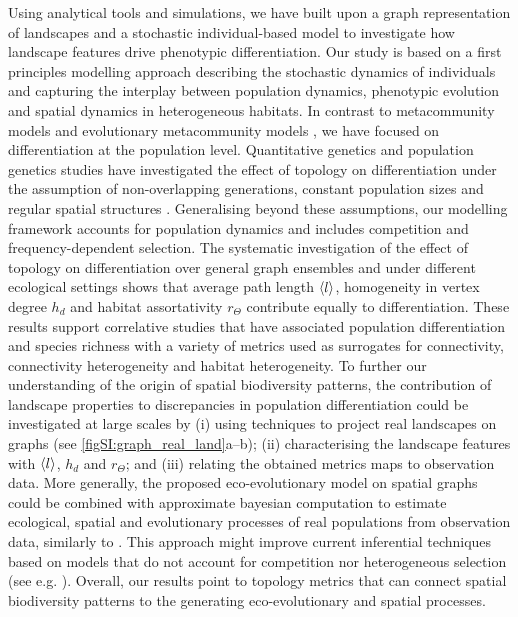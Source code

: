 Using analytical tools and simulations, we have built upon a graph representation of landscapes and a stochastic individual-based model to investigate how landscape features drive phenotypic differentiation.
%
Our study is based on a first principles modelling approach \citep{Champagnat2006} describing the stochastic dynamics of individuals and capturing the interplay between population dynamics, phenotypic evolution and spatial dynamics in heterogeneous habitats. In contrast to metacommunity models \citep{Holland2008,Gilarranz2012,Mari2014,Gravel2016,Carrara2012,Thompson2017,Suzuki2021} and evolutionary metacommunity models \citep{Economo2007,Economo2010}, we have focused on differentiation at the population level. Quantitative genetics and population genetics studies have investigated the effect of topology on differentiation under the assumption of non-overlapping generations, constant population sizes and regular spatial structures \citep{Burger2000,Kimura1964,Lande1991,Nagylaki1994,Yeaman2011}. Generalising beyond these assumptions, our modelling framework accounts for population dynamics and includes competition and frequency-dependent selection. The systematic investigation of the effect of topology on differentiation over general graph ensembles and under different ecological settings shows that average path length $\langle l \rangle$, homogeneity in vertex degree $h_d$ and habitat assortativity $r_\Theta$ contribute equally to differentiation.
%
These results support correlative studies that have associated population differentiation \citep{Manel2003,McRae2007} and species richness \citep{Liu2018,Dias2014,Rahbek2001,Kreft2007a,Davies2007,Veech2007,Guegan1998,Stein2014} with a variety of metrics used as surrogates for connectivity, connectivity heterogeneity and habitat heterogeneity. 
%
To further our understanding of the origin of spatial biodiversity patterns, the contribution of landscape properties to discrepancies in population differentiation could be investigated at large scales by (i) using techniques to project real landscapes on graphs (see \cref{figSI:graph_real_land}a--b); (ii) characterising the landscape features with $\langle l \rangle$, $h_d$ and $r_\Theta$; and (iii) relating the obtained metrics maps to observation data. 
%
More generally, the proposed eco-evolutionary model on spatial graphs could be combined with approximate bayesian computation to estimate ecological, spatial and evolutionary processes of real populations from observation data, similarly to \citep{Lepers2021}. This approach might improve current inferential techniques based on models that do not account for competition nor heterogeneous selection (see e.g. \citep{Petkova2015}).
%
Overall, our results point to topology metrics that can connect spatial biodiversity patterns to the generating eco-evolutionary and spatial processes.


